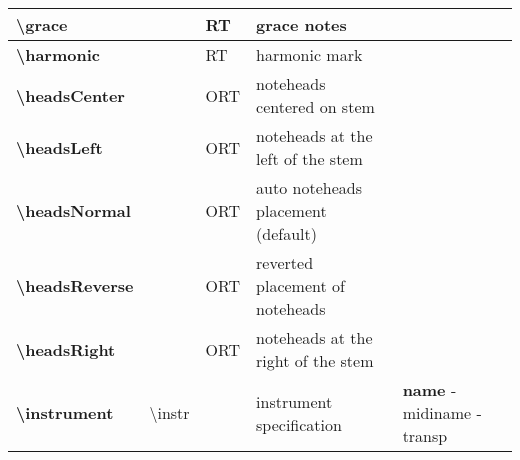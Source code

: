 \documentclass[a4paper, landscape, 10pt]{article}
\begin{document}
\begin{tabularx}{\linewidth}{p{3cm}p{4.5cm}p{3cm}p{5.5cm}l}
    \textbf{\textbackslash{}grace}&&RT&grace notes&\\
    \hline
    \textbf{\textbackslash{}harmonic}&&RT&harmonic mark&\\
    \hline
    \textbf{\textbackslash{}headsCenter}&&ORT&noteheads centered on stem&\\
    \hline
    \textbf{\textbackslash{}headsLeft}&&ORT&noteheads at the left of the stem&\\
    \hline
    \textbf{\textbackslash{}headsNormal}&&ORT&auto noteheads placement (default)&\\
    \hline
    \textbf{\textbackslash{}headsReverse}&&ORT&reverted placement of noteheads&\\
    \hline
    \textbf{\textbackslash{}headsRight}&&ORT&noteheads at the right of the stem&\\
    \hline
    \textbf{\textbackslash{}instrument}&\textbackslash{}instr&&instrument specification&\textbf{name} - midiname - transp\\
    \hline
\end{tabularx}
%
%
\end{document}
